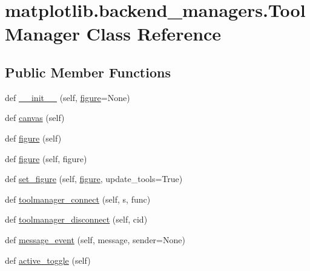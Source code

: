 \hypertarget{classmatplotlib_1_1backend__managers_1_1ToolManager}{}\section{matplotlib.\+backend\+\_\+managers.\+Tool\+Manager Class Reference}
\label{classmatplotlib_1_1backend__managers_1_1ToolManager}
\subsection*{Public Member Functions}
\begin{DoxyCompactItemize}
\item 
def \hyperlink{classmatplotlib_1_1backend__managers_1_1ToolManager_ac60138c7f52b5b58bc60aff39fe23758}{\+\_\+\+\_\+init\+\_\+\+\_\+} (self, \hyperlink{classmatplotlib_1_1backend__managers_1_1ToolManager_aafeaea5f9c448117328f7d5d7ff66e39}{figure}=None)
\item 
def \hyperlink{classmatplotlib_1_1backend__managers_1_1ToolManager_a1e62e5a862bfcbc54b5f1172df8fcc9f}{canvas} (self)
\item 
def \hyperlink{classmatplotlib_1_1backend__managers_1_1ToolManager_aafeaea5f9c448117328f7d5d7ff66e39}{figure} (self)
\item 
def \hyperlink{classmatplotlib_1_1backend__managers_1_1ToolManager_a6e76ed05b42dc424f8a17b04bf0d6bb4}{figure} (self, figure)
\item 
def \hyperlink{classmatplotlib_1_1backend__managers_1_1ToolManager_affec78f19af58a5c10f258f192a69a03}{set\+\_\+figure} (self, \hyperlink{classmatplotlib_1_1backend__managers_1_1ToolManager_aafeaea5f9c448117328f7d5d7ff66e39}{figure}, update\+\_\+tools=True)
\item 
def \hyperlink{classmatplotlib_1_1backend__managers_1_1ToolManager_afd9e0a90709887a79d39e55834f90225}{toolmanager\+\_\+connect} (self, s, func)
\item 
def \hyperlink{classmatplotlib_1_1backend__managers_1_1ToolManager_a99802a6ee6fa0ceab74d29c99f8a7019}{toolmanager\+\_\+disconnect} (self, cid)
\item 
def \hyperlink{classmatplotlib_1_1backend__managers_1_1ToolManager_a2dee0fa838b2e1457c37f680569498ad}{message\+\_\+event} (self, message, sender=None)
\item 
def \hyperlink{classmatplotlib_1_1backend__managers_1_1ToolManager_a5285c3e9f520ab135ae75a34955d2d8c}{active\+\_\+toggle} (self)
\item 

\end{DoxyCompactItemize}
